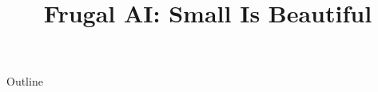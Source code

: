 \documentclass[xcolor=dvipsnames,compress,t,pdf,9pt]{beamer}
\title[\insertframenumber /\inserttotalframenumber]{Frugal AI: Small Is Beautiful}
\begin{document}
	\begin{frame}
	\titlepage
	\end{frame}

	\begin{frame}{Outline}
	    \tableofcontents
	\end{frame}

	
	
	
\end{document}
